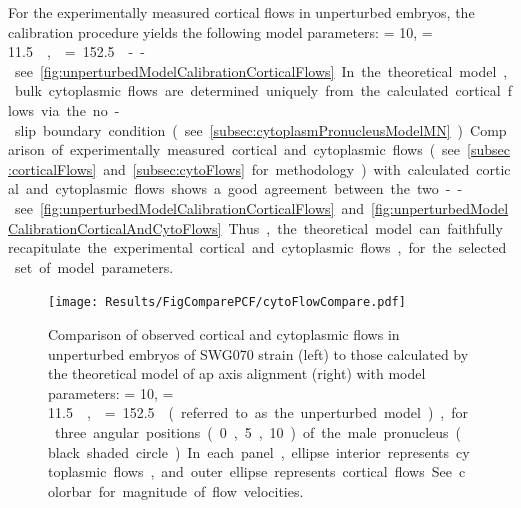 For the experimentally measured cortical flows in unperturbed embryos, the calibration procedure yields the following model parameters: \hydrodynamicLength = \SI{10}{\unitLength}, \activeRelaxLength = \SI{11.5}{\square\unitLength\per\second}, \nematicLength = \SI{152.5}{\square\unitLength\per\second} -- see \autoref{fig:unperturbedModelCalibrationCorticalFlows}. In the theoretical model, bulk cytoplasmic flows are determined uniquely from the calculated cortical flows via the no-slip boundary condition (see \autoref{subsec:cytoplasmPronucleusModelMN}). Comparison of experimentally measured cortical and cytoplasmic flows (see \autoref{subsec:corticalFlows} and \autoref{subsec:cytoFlows} for methodology) with calculated cortical and cytoplasmic flows shows a good agreement between the two -- see \autoref{fig:unperturbedModelCalibrationCorticalFlows} and \autoref{fig:unperturbedModelCalibrationCorticalAndCytoFlows}. Thus, the theoretical model can faithfully recapitulate the experimental cortical and cytoplasmic flows, for the selected set of model parameters.

\begin{figure}
    \centering
    \texttt{[image: Results/FigComparePCF/cytoFlowCompare.pdf]}
    \caption[Flows observed in unperturbed embryos compared to those calculated by theoretical model]{Comparison of observed cortical and cytoplasmic flows in unperturbed embryos of SWG070 strain (left) to those calculated by the theoretical model of \ac{ap} axis alignment (right) with model parameters: \hydrodynamicLength = \SI{10}{\unitLength}, \activeRelaxLength = \SI{11.5}{\square\unitLength\per\second}, \nematicLength = \SI{152.5}{\square\unitLength\per\second} (referred to as the unperturbed model), for three angular positions (\SI{0}{\unitAngle}, \SI{5}{\unitAngle}, \SI{10}{\unitAngle}) of the male pronucleus (black shaded circle).In each panel, ellipse interior represents cytoplasmic flows, and outer ellipse represents cortical flows. See colorbar for magnitude of flow velocities.}
    \label{fig:unperturbedModelCalibrationCorticalAndCytoFlows}
\end{figure}

